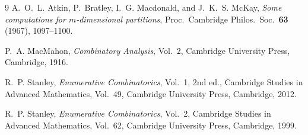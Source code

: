\documentclass[11pt,a4paper]{article}
\theoremstyle{definition}
\begin{document}
\begin{thebibliography}{9}
A.~O.~L. Atkin, P.~Bratley, I.~G. Macdonald, and J.~K.~S. McKay,
\emph{Some computations for $m$-dimensional partitions},
Proc.\ Cambridge Philos.\ Soc.\ \textbf{63} (1967), 1097--1100.

P.~A. MacMahon,
\emph{Combinatory Analysis}, Vol.~2,
Cambridge University Press, Cambridge, 1916.

R.~P. Stanley,
\emph{Enumerative Combinatorics}, Vol.~1, 2nd ed.,
Cambridge Studies in Advanced Mathematics, Vol.~49,
Cambridge University Press, Cambridge, 2012.

R.~P. Stanley,
\emph{Enumerative Combinatorics}, Vol.~2,
Cambridge Studies in Advanced Mathematics, Vol.~62,
Cambridge University Press, Cambridge, 1999.
\end{thebibliography}
\end{document}

